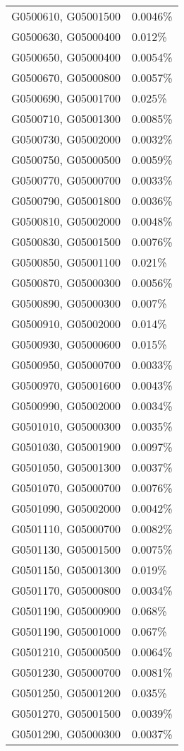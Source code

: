 \begin{longtable}[]{@{}ll@{}}
G0500610, G05001500 & 0.0046\% \\
G0500630, G05000400 & 0.012\% \\
G0500650, G05000400 & 0.0054\% \\
G0500670, G05000800 & 0.0057\% \\
G0500690, G05001700 & 0.025\% \\
G0500710, G05001300 & 0.0085\% \\
G0500730, G05002000 & 0.0032\% \\
G0500750, G05000500 & 0.0059\% \\
G0500770, G05000700 & 0.0033\% \\
G0500790, G05001800 & 0.0036\% \\
G0500810, G05002000 & 0.0048\% \\
G0500830, G05001500 & 0.0076\% \\
G0500850, G05001100 & 0.021\% \\
G0500870, G05000300 & 0.0056\% \\
G0500890, G05000300 & 0.007\% \\
G0500910, G05002000 & 0.014\% \\
G0500930, G05000600 & 0.015\% \\
G0500950, G05000700 & 0.0033\% \\
G0500970, G05001600 & 0.0043\% \\
G0500990, G05002000 & 0.0034\% \\
G0501010, G05000300 & 0.0035\% \\
G0501030, G05001900 & 0.0097\% \\
G0501050, G05001300 & 0.0037\% \\
G0501070, G05000700 & 0.0076\% \\
G0501090, G05002000 & 0.0042\% \\
G0501110, G05000700 & 0.0082\% \\
G0501130, G05001500 & 0.0075\% \\
G0501150, G05001300 & 0.019\% \\
G0501170, G05000800 & 0.0034\% \\
G0501190, G05000900 & 0.068\% \\
G0501190, G05001000 & 0.067\% \\
G0501210, G05000500 & 0.0064\% \\
G0501230, G05000700 & 0.0081\% \\
G0501250, G05001200 & 0.035\% \\
G0501270, G05001500 & 0.0039\% \\
G0501290, G05000300 & 0.0037\% \\

\end{longtable}
